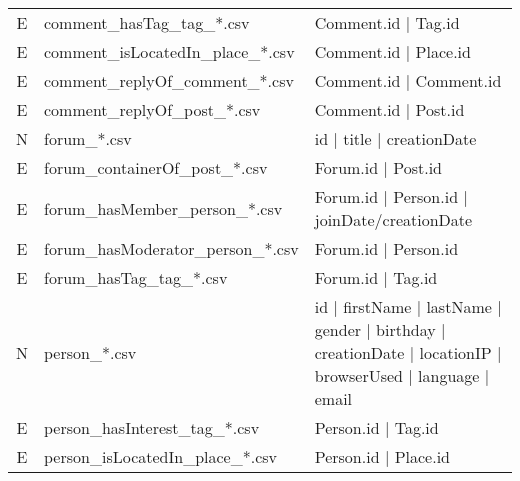 \begin{table}[htb]
\begin{tabular}{|c|p{4.6cm}|p{11.4cm}|}
        E                       & comment\_hasTag\_tag\_*.csv             & Comment.id | Tag.id                                                                                         \\ 
        E                       & comment\_isLocatedIn\_place\_*.csv      & Comment.id | Place.id                                                                                       \\ 
        E                       & comment\_replyOf\_comment\_*.csv        & Comment.id | Comment.id                                                                                     \\ 
        E                       & comment\_replyOf\_post\_*.csv           & Comment.id | Post.id                                                                                        \\
		\hline
        N                       & forum\_*.csv                            & id | title | creationDate                                                                                   \\
        E                       & forum\_containerOf\_post\_*.csv         & Forum.id | Post.id                                                                                          \\
        E                       & forum\_hasMember\_person\_*.csv         & Forum.id | Person.id | joinDate/creationDate                                                                \\
        E                       & forum\_hasModerator\_person\_*.csv      & Forum.id | Person.id                                                                                        \\
        E                       & forum\_hasTag\_tag\_*.csv               & Forum.id | Tag.id                                                                                           \\
		\hline
        N                       & person\_*.csv                           & id | firstName | lastName | gender | birthday | creationDate | locationIP | browserUsed | language | email  \\
        E                       & person\_hasInterest\_tag\_*.csv         & Person.id | Tag.id                                                                                          \\
        E                       & person\_isLocatedIn\_place\_*.csv       & Person.id | Place.id                                                                                        \\

\end{tabular}
\end{table}
